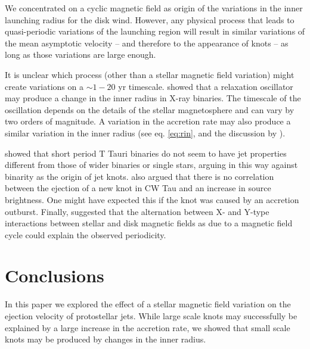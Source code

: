 \documentclass{emulateapj}
\begin{document}
We concentrated on a cyclic magnetic field as
origin of the variations in the inner launching radius for the disk
wind. However, any physical process that leads to quasi-periodic
variations of the launching region will result in similar variations
of the mean asymptotic velocity -- and therefore to the appearance
of knots -- as long as those variations are large enough.

It is unclear which process (other than a stellar magnetic field
variation) might create variations on a 
$\sim 1-20$ yr timescale.
\citet{st03} showed that a relaxation oscillator 
may produce a change in the inner radius in X-ray binaries. The timescale
of the oscillation depends on the details of the stellar magnetosphere
and can vary by two orders of magnitude.
A variation in the accretion rate may also produce a similar
variation in the inner radius (see eq. \ref{eq:rin}, and the discussion
by \citealt{bla01}).

\citet{har04} showed that short period T Tauri binaries do not seem 
to have jet properties different from those of wider binaries or single
stars, arguing in this way against binarity as the origin of jet knots.
%
\citet{har04} also argued that there is no 
correlation between the
ejection of a new knot in CW Tau and an increase in source brightness.
One might have expected this if the knot was caused by an accretion outburst.
%
Finally, \citet{fer06} suggested that the alternation between X- and 
Y-type interactions between stellar and disk magnetic fields 
as due to a magnetic field cycle could explain the observed periodicity.
 



\section{Conclusions}
\label{conclusion}

In this paper we explored the effect of a stellar magnetic field 
variation on the ejection velocity of protostellar jets.
While large scale knots may successfully be explained by a large
increase in the accretion rate, we showed that small scale knots 
may be produced by changes in the inner radius.
\end{document}
